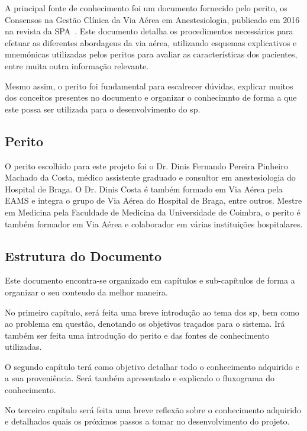 \documentclass[a4paper,12pt,twoside]{article}
\begin{document}
    A principal fonte de conhecimento foi um documento fornecido pelo perito, os Consensos na Gestão Clínica da Via Aérea em Anestesiologia, publicado em 2016 na revista da \gls{SPA}~\cite{consensosva}. Este documento detalha os procedimentos necessários para efetuar as diferentes abordagens da via aérea, utilizando esquemas explicativos e mnemónicas utilizadas pelos peritos para avaliar as características dos pacientes, entre muita outra informação relevante.

    Mesmo assim, o perito foi fundamental para escalrecer dúvidas, explicar muitos dos conceitos presentes no documento e organizar o conhecimnto de forma a que este possa ser utilizada para o desenvolvimento do \gls{sp}.

    \subsection{Perito}

    O perito escolhido para este projeto foi o Dr. Dinis Fernando Pereira Pinheiro Machado da Costa, médico assistente graduado e consultor em anestesiologia do Hospital de Braga. O Dr. Dinis Costa é também formado em Via Aérea pela \gls{EAMS} e integra o grupo de Via Aérea do Hospital de Braga, entre outros. Mestre em Medicina pela Faculdade de Medicina da Universidade de Coimbra, o perito é também formador em Via Aérea e colaborador em várias instituições hospitalares.

    \subsection{Estrutura do Documento}

    Este documento encontra-se organizado em capítulos e sub-capítulos de forma a organizar o seu conteudo da melhor maneira.

    No primeiro capítulo, será feita uma breve introdução ao tema dos \gls{sp}, bem como ao problema em questão, denotando os objetivos traçados para o sistema. Irá também ser feita uma introdução do perito e das fontes de conhecimento utilizadas.

    O segundo capítulo terá como objetivo detalhar todo o conhecimento adquirido e a sua proveniência. Será também apresentado e explicado o fluxograma do conhecimento.\@

    No terceiro capítulo será feita uma breve reflexão sobre o conhecimento adquirido e detalhados quais os próximos passos a tomar no desenvolvimento do projeto.
\end{document}
